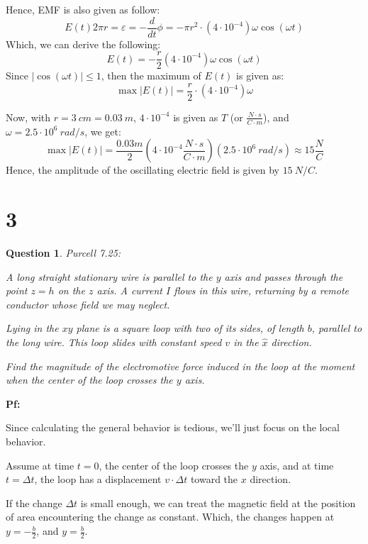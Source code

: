 \documentclass{article}
\newtheorem{question}{Question}
\begin{document}
Hence, EMF is also given as follow:
$$E(t)2\pi r=\varepsilon=-\frac{d}{dt}\phi = -\pi r^2\cdot (4\cdot 10^{-4})\omega \cos(\omega t)$$
Which, we can derive the following:
$$E(t)=-\frac{r}{2}(4\cdot 10^{-4})\omega \cos(\omega t)$$
Since $|\cos(\omega t)|\leq 1$, then the maximum of $E(t)$ is given as:
$$\max|E(t)|=\frac{r}{2}\cdot (4\cdot 10^{-4})\omega$$

\hfill

Now, with $r=3\ cm=0.03\ m$, $4\cdot 10^{-4}$ is given as $T$ (or $\frac{N\cdot s}{C\cdot m}$), and $\omega = 2.5\cdot 10^6\ rad/s$, we get:
$$\max|E(t)|=\frac{0.03 m}{2}\left(4\cdot 10^{-4} \frac{N\cdot s}{C\cdot m}\right)(2.5\cdot 10^6\ rad/s)\approx 15 \frac{N}{C}$$
Hence, the amplitude of the oscillating electric field is given by $15\ N/C$.

\break

\section*{3}
\begin{myBox}[]{}
    \begin{question}
        Purcell 7.25:

        A long straight stationary wire is parallel to the $y$ axis and passes
        through the point $z = h$ on the $z$ axis. A current $I$ flows in this
        wire, returning by a remote conductor whose field we may neglect.

        Lying in the $xy$ plane is a square loop with two of its sides, of
        length $b$, parallel to the long wire. This loop slides with constant
        speed $v$ in the $\hat{x}$ direction. 
        
        Find the magnitude of the electromotive
        force induced in the loop at the moment when the center of the
        loop crosses the $y$ axis.
    \end{question}
\end{myBox}

\textbf{Pf:}

Since calculating the general behavior is tedious, we'll just focus on the local behavior.

Assume at time $t=0$, the center of the loop crosses the $y$ axis, and at time $t=\Delta t$, the loop has a displacement $v\cdot \Delta t$ toward the $x$ direction.

If the change $\Delta t$ is small enough, we can treat the magnetic field at the position of area encountering the change as constant.
Which, the changes happen at $y=-\frac{b}{2}$, and $y=\frac{b}{2}$.
\end{document}
